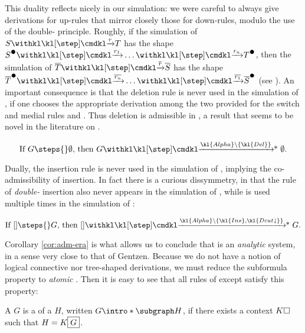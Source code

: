 \begin{scope}
This duality reflects nicely in our simulation: we were careful to always give
derivations for up-rules that mirror closely those for down-rules, modulo the
use of the double- principle. Roughly, if the simulation of $S \xstep{r} T$
has the shape $\strans{S} \xstep{r_1} \ldots \xstep{r_n} \strans{T}$, then the
simulation of $\dmdual{T} \xstep{\dmdual{r}} \dmdual{S}$ has the shape
$\strans{\dmdual{T}} \xstep{\dmdual{r_n}} \ldots \xstep{\dmdual{r_1}}
\strans{\dmdual{S}}$ (see ). An important consequence is
that the deletion rule  is never used in the simulation of , if
one chooses the appropriate derivation among the two provided for the switch and
medial rules  and . Thus deletion is admissible in , a
result that seems to be novel in the literature on .

\begin{corollary}\label{cor:adm-era}
  $$
  \text{If $G \steps{} \emptyset$, then $G \xsteps{\kl{Alpha}\setminus\{\kl{Del}\}}
  \emptyset$.}
  $$
\end{corollary}

Dually, the insertion rule  is never used in the simulation of
, implying the co-admissibility of insertion. In fact there is
a curious dissymmetry, in that the rule  of \emph{double-}
insertion also never appears in the simulation of , while
 is used multiple times in the simulation of :

\begin{corollary}\label{cor:adm-ins}
  $$
  \text{If $[] \steps{} G$, then $[]
  \xsteps{\kl{Alpha}\setminus\{\kl{Ins},\kl{Dcut{\da}}\}} G$.}
  $$
\end{corollary}

Corollary \ref{cor:adm-era} is what allows us to conclude that  is an
\emph{analytic} system, in a sense very close to that of Gentzen. Because we do
not have a notion of logical connective nor tree-shaped derivations, we must
reduce the subformula property to \emph{atomic} . Then it is easy to see
that all rules of  except  satisfy this property:

\begin{definition}[Subgraph]
  A  $G$ is a  of a  $H$, written $G \intro*\subgraph
  H$, if there exists a context $K\square$ such that $H = K\fbox{$G$}$.
\end{definition}


\end{scope}
